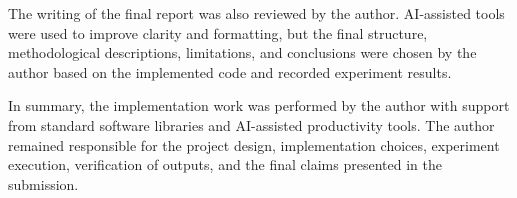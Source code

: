 \documentclass[11pt]{article}
\begin{document}
The writing of the final report was also reviewed by the author. AI-assisted tools were used to improve clarity and formatting, but the final structure, methodological descriptions, limitations, and conclusions were chosen by the author based on the implemented code and recorded experiment results.

In summary, the implementation work was performed by the author with support from standard software libraries and AI-assisted productivity tools. The author remained responsible for the project design, implementation choices, experiment execution, verification of outputs, and the final claims presented in the submission.
\end{document}

